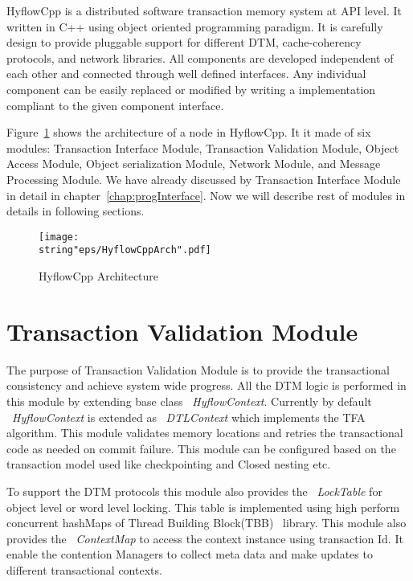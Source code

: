 \documentclass[12pt,english]{report}
\begin{document}
HyflowCpp is a distributed software transaction memory system at API level. It written in C++ using object oriented programming paradigm. It is carefully design to provide pluggable support for different DTM, cache-coherency protocols, and network libraries. All components are developed independent of each other and connected through well defined interfaces. Any individual component can be easily replaced or modified by writing a implementation compliant to the given component interface. 

Figure~\ref{Fig:HyflowCppArch} shows the architecture of a node in HyflowCpp. It it made of six modules: Transaction Interface Module, Transaction Validation Module, Object Access Module, Object serialization Module, Network Module, and Message Processing Module. We have already discussed by Transaction Interface Module in detail in chapter~\ref{chap:progInterface}. Now we will describe rest of modules in details in following sections.

\begin{figure}
\begin{minipage}[b]{0.9\linewidth}\centering
\centering \texttt{[image: \\string"eps/HyflowCppArch".pdf]}
\caption{HyflowCpp Architecture}
\label{Fig:HyflowCppArch}
\end{minipage}
\end{figure}

\section{Transaction Validation Module}

The purpose of Transaction Validation Module is to provide the transactional consistency and achieve system wide progress. All the DTM logic is performed in this module by extending base class ~\emph{HyflowContext}. Currently by default ~\emph{HyflowContext} is extended as ~\emph{DTLContext} which implements the TFA algorithm. This module validates memory locations and retries the transactional code as needed on commit failure. This module can be configured based on the transaction model used like checkpointing and Closed nesting etc. 

To support the DTM protocols this module also provides the ~\emph{LockTable} for object level or word level locking. This table is implemented using high perform concurrent hashMaps of Thread Building Block(TBB)~\cite{willhalm2008putting} library. This module also provides the ~\emph{ContextMap} to access the context instance using transaction Id. It enable the contention Managers to collect meta data and make updates to different transactional contexts.
\end{document}
